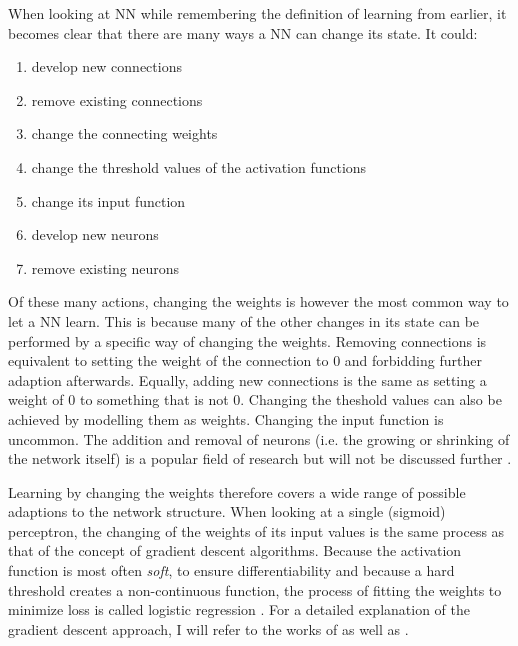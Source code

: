 When looking at \ac {NN} while remembering the definition of learning from earlier, it becomes clear that there are many
ways a \ac {NN} can change its state. It could:

\begin{enumerate}
    \item develop new connections
    \item remove existing connections
    \item change the connecting weights
    \item change the threshold values of the activation functions
    \item change its input function
    \item develop new neurons
    \item remove existing neurons \cite[p.60]{kriesel2007brief} 
\end{enumerate}

Of these many actions, changing the weights is however the most common way to let a \ac {NN} learn. This is because many
of the other changes in its state can be performed by a specific way of changing the weights. Removing connections is
equivalent to setting the weight of the connection to 0 and forbidding further adaption afterwards. Equally, adding new
connections is the same as setting a weight of 0 to something that is not 0. Changing the theshold values can also be
achieved by modelling them as weights. Changing the input function is uncommon. The addition and removal of neurons
(i.e. the growing or shrinking of the network itself) is a popular field of research but will not be discussed further
\cite[p.60]{kriesel2007brief}. 

Learning by changing the weights therefore covers a wide range of possible adaptions to the network structure. When
looking at a single (sigmoid) perceptron, the changing of the weights of its input values is the same process as that of the
concept of gradient descent algorithms. Because the activation function is most often \emph{soft}, to ensure
differentiability and because a hard threshold creates a non-continuous function, the process of fitting the weights to
minimize loss is called logistic regression \cite[p.729f.]{russell2016artificial}. For a detailed explanation of the gradient
descent approach, I will refer to the works of \citet{russell2016artificial} as well as
\citet{Goodfellow-et-al-2016}. 

 


